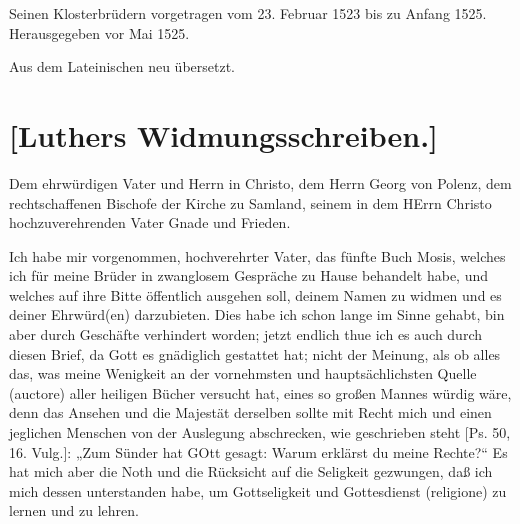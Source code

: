 \begin{center}
Seinen Klosterbrüdern vorgetragen vom 23. Februar 1523 bis zu Anfang 1525. Herausgegeben vor Mai 1525.

Aus dem Lateinischen neu übersetzt.
\end{center}

\section{[Luthers Widmungsschreiben.]}

Dem ehrwürdigen Vater und Herrn in Christo, dem Herrn Georg von Polenz, dem rechtschaffenen Bischofe der Kirche zu Samland, seinem in dem HErrn Christo hochzuverehrenden Vater Gnade und Frieden.

Ich habe mir vorgenommen, hochverehrter Vater, das fünfte Buch Mosis, welches ich für meine Brüder in zwanglosem Gespräche zu Hause behandelt habe, und welches auf ihre Bitte öffentlich ausgehen soll, deinem Namen zu widmen und es deiner Ehrwürd(en) darzubieten. Dies habe ich schon lange im Sinne gehabt, bin aber durch Geschäfte verhindert worden; jetzt endlich thue ich es auch durch diesen Brief, da Gott es gnädiglich gestattet hat; nicht der Meinung, als ob alles das, was meine Wenigkeit an der vornehmsten und hauptsächlichsten Quelle (auctore) aller heiligen Bücher versucht hat, eines so großen Mannes würdig wäre, denn das Ansehen und die Majestät derselben sollte mit Recht mich und einen jeglichen Menschen von der Auslegung abschrecken, wie geschrieben steht [Ps. 50, 16. Vulg.]: „Zum Sünder hat GOtt gesagt: Warum erklärst du meine Rechte?“ Es hat mich aber die Noth und die Rücksicht auf die Seligkeit gezwungen, daß ich mich dessen unterstanden habe, um Gottseligkeit und Gottesdienst (religione) zu lernen und zu lehren.

